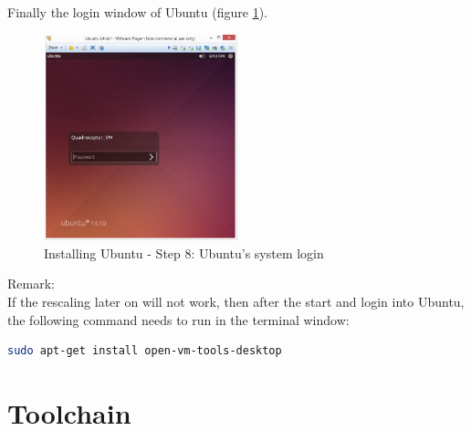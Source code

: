 Finally the login window of Ubuntu (figure \ref{fig:Ub9}).

\begin{figure}[H]
	\centering\includegraphics[width=0.5\textwidth]{fig/Dev_Concept/Ub9.jpg}
	\caption{Installing Ubuntu - Step 8: Ubuntu's system login}
	\label{fig:Ub9}
\end{figure}

Remark:\\
If the rescaling later on will not work, then after the start and login into Ubuntu, the following command needs to run in the terminal window:
\begin{lstlisting}[language=bash,otherkeywords={sudo,tar,touch,gedit,cp,apt-get,mkdir}]
sudo apt-get install open-vm-tools-desktop
\end{lstlisting}


\section{Toolchain}
\label{subsec:sec-TC}

